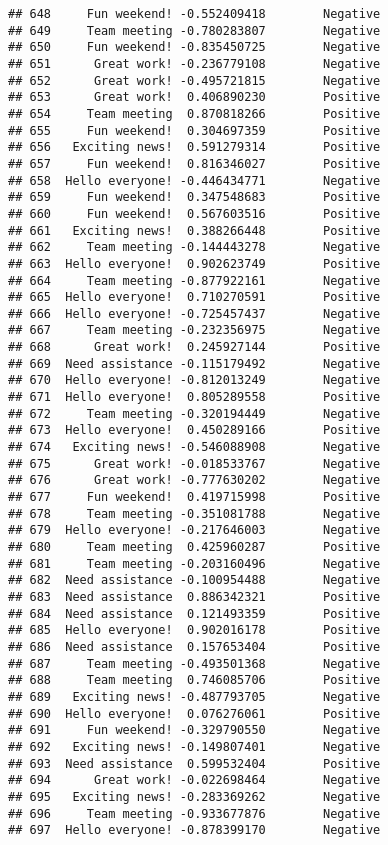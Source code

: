 \documentclass[
]{article}
\begin{document}
\begin{verbatim}
## 648     Fun weekend! -0.552409418        Negative
## 649     Team meeting -0.780283807        Negative
## 650     Fun weekend! -0.835450725        Negative
## 651      Great work! -0.236779108        Negative
## 652      Great work! -0.495721815        Negative
## 653      Great work!  0.406890230        Positive
## 654     Team meeting  0.870818266        Positive
## 655     Fun weekend!  0.304697359        Positive
## 656   Exciting news!  0.591279314        Positive
## 657     Fun weekend!  0.816346027        Positive
## 658  Hello everyone! -0.446434771        Negative
## 659     Fun weekend!  0.347548683        Positive
## 660     Fun weekend!  0.567603516        Positive
## 661   Exciting news!  0.388266448        Positive
## 662     Team meeting -0.144443278        Negative
## 663  Hello everyone!  0.902623749        Positive
## 664     Team meeting -0.877922161        Negative
## 665  Hello everyone!  0.710270591        Positive
## 666  Hello everyone! -0.725457437        Negative
## 667     Team meeting -0.232356975        Negative
## 668      Great work!  0.245927144        Positive
## 669  Need assistance -0.115179492        Negative
## 670  Hello everyone! -0.812013249        Negative
## 671  Hello everyone!  0.805289558        Positive
## 672     Team meeting -0.320194449        Negative
## 673  Hello everyone!  0.450289166        Positive
## 674   Exciting news! -0.546088908        Negative
## 675      Great work! -0.018533767        Negative
## 676      Great work! -0.777630202        Negative
## 677     Fun weekend!  0.419715998        Positive
## 678     Team meeting -0.351081788        Negative
## 679  Hello everyone! -0.217646003        Negative
## 680     Team meeting  0.425960287        Positive
## 681     Team meeting -0.203160496        Negative
## 682  Need assistance -0.100954488        Negative
## 683  Need assistance  0.886342321        Positive
## 684  Need assistance  0.121493359        Positive
## 685  Hello everyone!  0.902016178        Positive
## 686  Need assistance  0.157653404        Positive
## 687     Team meeting -0.493501368        Negative
## 688     Team meeting  0.746085706        Positive
## 689   Exciting news! -0.487793705        Negative
## 690  Hello everyone!  0.076276061        Positive
## 691     Fun weekend! -0.329790550        Negative
## 692   Exciting news! -0.149807401        Negative
## 693  Need assistance  0.599532404        Positive
## 694      Great work! -0.022698464        Negative
## 695   Exciting news! -0.283369262        Negative
## 696     Team meeting -0.933677876        Negative
## 697  Hello everyone! -0.878399170        Negative

\end{verbatim}
\end{document}

